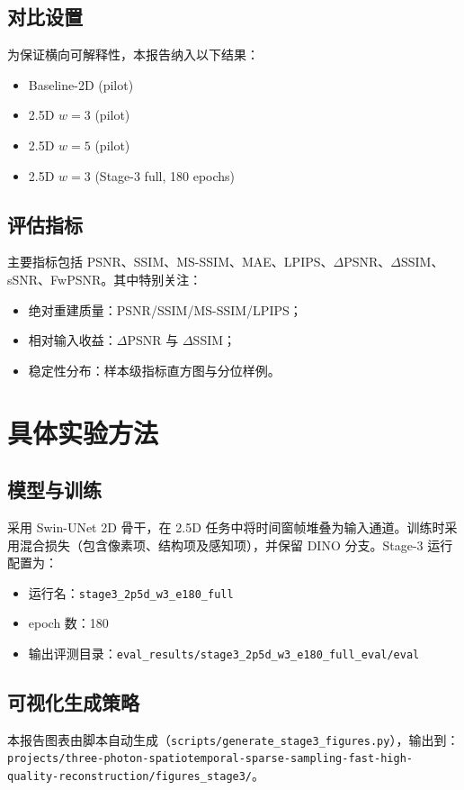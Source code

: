 \documentclass[11pt,a4paper]{article}
\begin{document}
\subsection{对比设置}
为保证横向可解释性，本报告纳入以下结果：
\begin{itemize}[leftmargin=2em]
    \item Baseline-2D (pilot)
    \item 2.5D $w=3$ (pilot)
    \item 2.5D $w=5$ (pilot)
    \item 2.5D $w=3$ (Stage-3 full, 180 epochs)
\end{itemize}

\subsection{评估指标}
主要指标包括 PSNR、SSIM、MS-SSIM、MAE、LPIPS、$\Delta$PSNR、$\Delta$SSIM、sSNR、FwPSNR。其中特别关注：
\begin{itemize}[leftmargin=2em]
    \item 绝对重建质量：PSNR/SSIM/MS-SSIM/LPIPS；
    \item 相对输入收益：$\Delta$PSNR 与 $\Delta$SSIM；
    \item 稳定性分布：样本级指标直方图与分位样例。
\end{itemize}

\section{具体实验方法}
\subsection{模型与训练}
采用 Swin-UNet 2D 骨干，在 2.5D 任务中将时间窗帧堆叠为输入通道。训练时采用混合损失（包含像素项、结构项及感知项），并保留 DINO 分支。Stage-3 运行配置为：
\begin{itemize}[leftmargin=2em]
    \item 运行名：\texttt{stage3\_2p5d\_w3\_e180\_full}
    \item epoch 数：180
    \item 输出评测目录：\texttt{eval\_results/stage3\_2p5d\_w3\_e180\_full\_eval/eval}
\end{itemize}

\subsection{可视化生成策略}
本报告图表由脚本自动生成（\texttt{scripts/generate\_stage3\_figures.py}），输出到：
\texttt{projects/three-photon-spatiotemporal-sparse-sampling-fast-high-quality-reconstruction/figures\_stage3/}。
\end{document}

